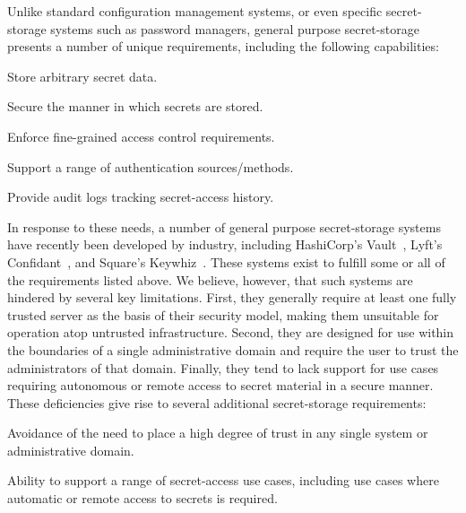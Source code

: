 Unlike standard configuration management systems, or even specific
secret-storage systems such as password managers, general purpose
secret-storage presents a number of unique requirements, including the
following capabilities:

\begin{packed_item}
\item Store arbitrary secret data.
\item Secure the manner in which secrets are stored.
\item Enforce fine-grained access control requirements.
\item Support a range of authentication sources/methods.
\item Provide audit logs tracking secret-access history.
\end{packed_item}

In response to these needs, a number of general purpose secret-storage
systems have recently been developed by industry, including
HashiCorp's Vault~\cite{vault}, Lyft's Confidant~\cite{confidant}, and
Square's Keywhiz~\cite{keywhiz}. These systems exist to fulfill some
or all of the requirements listed above. We believe, however, that
such systems are hindered by several key limitations. First, they
generally require at least one fully trusted server as the basis of
their security model, making them unsuitable for operation atop
untrusted infrastructure. Second, they are designed for use within the
boundaries of a single administrative domain and require the user to
trust the administrators of that domain. Finally, they tend to lack
support for use cases requiring autonomous or remote access to secret
material in a secure manner. These deficiencies give rise to several
additional secret-storage requirements:

\begin{packed_item}
\item Avoidance of the need to place a high degree of trust in any
  single system or administrative domain.
\item Ability to support a range of secret-access use cases, including
  use cases where automatic or remote access to secrets is required.
\end{packed_item}


